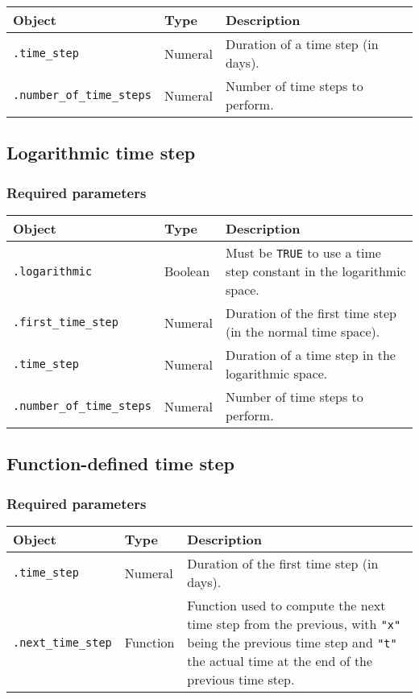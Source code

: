 \documentclass[10pt]{article}
\begin{document}
\begin{tabularx}{\textwidth}{llX}
\hline 
Object & Type & Description \\ 
\hline 
\verb+.time_step+ & Numeral & Duration of a time step (in days). \\ 
\verb+.number_of_time_steps+ & Numeral & Number of time steps to perform.\\
\hline 
\end{tabularx}

\subsection{Logarithmic time step}

\subsubsection*{Required parameters}

\begin{tabularx}{\textwidth}{llX}
\hline 
Object & Type & Description \\ 
\hline 
\verb+.logarithmic+ & Boolean & Must be \verb+TRUE+ to use a time step constant in the logarithmic space. \\ 
\verb+.first_time_step+ & Numeral & Duration of the first time step (in the normal time space). \\ 
\verb+.time_step+ & Numeral & Duration of a time step in the logarithmic space. \\ 
\verb+.number_of_time_steps+ & Numeral & Number of time steps to perform.\\
\hline 
\end{tabularx}

\subsection{Function-defined time step}

\subsubsection*{Required parameters}

\begin{tabularx}{\textwidth}{llX}
\hline 
Object & Type & Description \\ 
\hline 
\verb+.time_step+ & Numeral & Duration of the first time step (in days). \\ 
\verb+.next_time_step+ & Function & Function used to compute the next time step from the previous, with \verb+"x"+ being the previous time step and \verb+"t"+ the actual time at the end of the previous time step. \\ 
\hline 
\end{tabularx}
\end{document}
